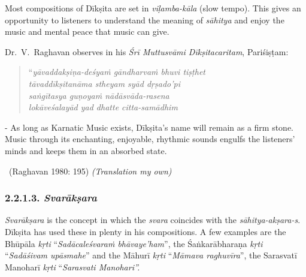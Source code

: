 Most compositions of Dīkṣita are set in \textit{viḷamba-kāla} (slow tempo). This gives an opportunity to listeners to understand the meaning of \textit{sāhitya} and enjoy the music and mental peace that music can give.

Dr.~V.~Raghavan observes in his \textit{Śrī Muttusvāmi Dīkṣitacaritam}, Pariśiṣṭam:

\begin{verse}
“\textit{yāvaddakṣiṇa-deśyaṁ gāndharvaṁ bhuvi tiṣṭhet} \\ \textit{tāvaddīkṣitanāma stheyam syād dṛṣado'pi} \\ \textit{saṅgītasya guṇoyaṁ nādāsvāda-rasena} \\ \textit{lokāveśalayād yad dhatte citta-samādhim} 
\end{verse}

\begin{myquote}
- As long as Karnatic Music exists, Dīkṣita’s name will remain as a firm stone. Music through its enchanting, enjoyable, rhythmic sounds engulfs the listeners’ minds and keeps them in an absorbed state. 

~\hfill (Raghavan 1980: 195) \textit{(Translation my own)}
\end{myquote}

\vspace{-.3cm}

\subsubsection*{2.2.1.3. \textit{Svarākṣara}}

\textit{Svarākṣara} is the concept in which the \textit{svara} coincides with the \textit{sāhitya-akṣara-s}. Dīkṣita has used these in plenty in his compositions. A few examples are the Bhūpāla \textit{kṛti} “\textit{Sadācaleśvaraṁ bhāvaye’ham}”, the Śaṅkarābharaṇa \textit{kṛti} “\textit{Sadāśivam upāsmahe}” and the Māhurī \textit{kṛti} “\textit{Māmava raghuvīra}”, the Sarasvatī Manoharī \textit{kṛti} “\textit{Sarasvati Manohari”.}


\vspace{-.3cm}

